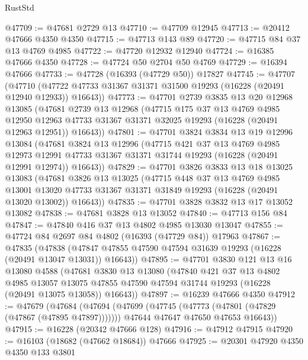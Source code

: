 \begin{lexlean}{RustStd}
\begin{coremodule}
@47709 := @47681 @2729 @13
@47710 := @47709 @12945
@47713 := @20412 @47666 @4350 @4350
@47715 := @47713 @143 @89
@47720 := @47715 @84 @37 @13 @4769 @4985
@47722 := @47720 @12932 @12940
@47724 := @16385 @47666 @4350
@47728 := @47724 @50 @2704 @50 @4769
@47729 := @16394 @47666
@47733 := @47728 (@16393 (@47729 @50)) @17827
@47745 := @47707
    (@47710 (@47722 @47733 @31367 @31371 @31500 @19293 (@16228 (@20491 @12940 @12933)) @16643))
@47773 := @47701
    @2739
    @3835
    @13
    @20
    @12968
    @13085
    (@47681
      @2739
      @13
      @12968
      (@47715
        @175
        @37
        @13
        @4769
        @4985
        @12950
        @12963
        @47733
        @31367
        @31371
        @32025
        @19293
        (@16228 (@20491 @12963 @12951))
        @16643))
@47801 := @47701
    @3824
    @3834
    @13
    @19
    @12996
    @13084
    (@47681
      @3824
      @13
      @12996
      (@47715
        @421
        @37
        @13
        @4769
        @4985
        @12973
        @12991
        @47733
        @31367
        @31371
        @31744
        @19293
        (@16228 (@20491 @12991 @12974))
        @16643))
@47829 := @47701
    @3826
    @3833
    @13
    @18
    @13025
    @13083
    (@47681
      @3826
      @13
      @13025
      (@47715
        @448
        @37
        @13
        @4769
        @4985
        @13001
        @13020
        @47733
        @31367
        @31371
        @31849
        @19293
        (@16228 (@20491 @13020 @13002))
        @16643))
@47835 := @47701 @3828 @3832 @13 @17 @13052 @13082
@47838 := @47681 @3828 @13 @13052
@47840 := @47713 @156 @84
@47847 := @47840 @416 @37 @13 @4802 @4985 @13030 @13047
@47855 := @47724 @84 @2697 @84 @4802 (@16393 (@47729 @84)) @17963
@47867 := @47835
    (@47838 (@47847 @47855 @47590 @47594 @31639 @19293 (@16228 (@20491 @13047 @13031)) @16643))
@47895 := @47701
    @3830
    @121
    @13
    @16
    @13080
    @4588
    (@47681
      @3830
      @13
      @13080
      (@47840
        @421
        @37
        @13
        @4802
        @4985
        @13057
        @13075
        @47855
        @47590
        @47594
        @31744
        @19293
        (@16228 (@20491 @13075 @13058))
        @16643))
@47897 := @16239 @47666 @4350
@47912 := @47679
    (@47684
      (@47694
        (@47699 (@47745 (@47773 (@47801 (@47829 (@47867 (@47895 @47897)))))))
        @47644
        @47647
        @47650
        @47653
        @16643))
@47915 := @16228 (@20342 @47666 @128)
@47916 := @47912 @47915
@47920 := @16103 (@18682 (@47662 @18684)) @47666
@47925 := @20301 @47920 @4350 @4350 @133 @3801

\end{coremodule}
\end{lexlean}
